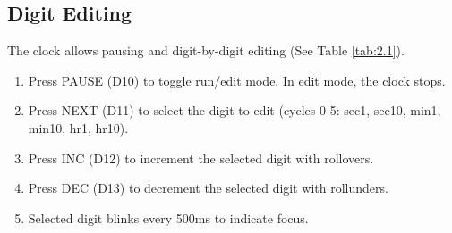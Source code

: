 \subsection{Digit Editing}
The clock allows pausing and digit-by-digit editing
(See Table \ref{tab:2.1}).
\begin{enumerate}
    \item Press PAUSE (D10) to toggle run/edit mode. In edit mode, the clock stops.
    \item Press NEXT (D11) to select the digit to edit (cycles 0-5: sec1, sec10, min1, min10, hr1, hr10).
    \item Press INC (D12) to increment the selected digit with rollovers.
    \item Press DEC (D13) to decrement the selected digit with rollunders.
    \item Selected digit blinks every 500ms to indicate focus.
\end{enumerate}

